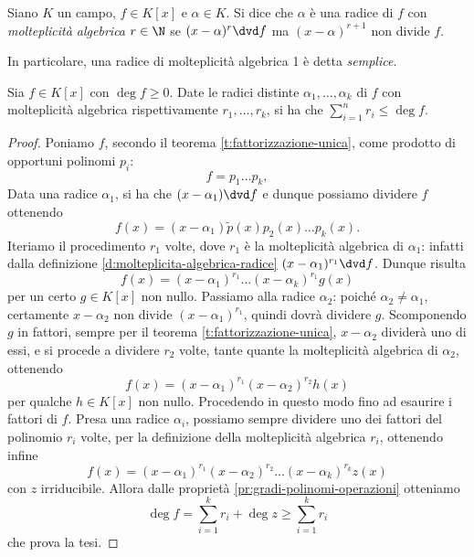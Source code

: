 \begin{definizione} \label{d:molteplicita-algebrica-radice}
	Siano $K$ un campo, $f\in K[x]$ e $\alpha\in K$.
	Si dice che $\alpha$ è una radice di $f$ con \emph{molteplicità algebrica} $r\in \N$ se $(x-\alpha)^r\dvd f$ ma $(x-\alpha)^{r+1}$ non divide $f$.
\end{definizione}
In particolare, una radice di molteplicità algebrica 1 è detta \emph{semplice}.
\begin{teorema}\label{dimensione-molteplicita-algebrica}
	Sia $f\in K[x]$ con $\deg f\ge 0$.
	Date le radici distinte $\alpha_1,\dots,\alpha_k$ di $f$ con molteplicità algebrica rispettivamente $r_1,\dots,r_k$, si ha che $\sum_{i=1}^n r_i\le\deg f$.
\end{teorema}
\begin{proof}
	Poniamo $f$, secondo il teorema \ref{t:fattorizzazione-unica}, come prodotto di opportuni polinomi $p_i$:
	\begin{equation}
		f = p_1\dots p_k,
	\end{equation}
	Data una radice $\alpha_1$, si ha che $(x-\alpha_1)\dvd f$ e dunque possiamo dividere $f$ ottenendo
	\begin{equation}
		f(x) = (x-\alpha_1)\tilde{p}(x)p_2(x)\dots p_k(x).
	\end{equation}
	Iteriamo il procedimento $r_1$ volte, dove $r_1$ è la molteplicità algebrica di $\alpha_1$: infatti dalla definizione \ref{d:molteplicita-algebrica-radice} $(x-\alpha_1)^{r_1}\dvd f$.
	Dunque risulta
	\begin{equation}
		f(x) = (x-\alpha_1)^{r_1}\dots(x-\alpha_k)^{r_1}g(x)
	\end{equation}
	per un certo $g\in K[x]$ non nullo.
	Passiamo alla radice $\alpha_2$: poich\'e $\alpha_2\ne\alpha_1$, certamente $x-\alpha_2$ non divide $(x-\alpha_1)^{r_1}$, quindi dovrà dividere $g$.
	Scomponendo $g$ in fattori, sempre per il teorema \ref{t:fattorizzazione-unica}, $x-\alpha_2$ dividerà uno di essi, e si procede a dividere $r_2$ volte, tante quante la molteplicità algebrica di $\alpha_2$, ottenendo
	\begin{equation}
		f(x)=(x-\alpha_1)^{r_1}(x-\alpha_2)^{r_2}h(x)
	\end{equation}
	per qualche $h\in K[x]$ non nullo.
	Procedendo in questo modo fino ad esaurire i fattori di $f$.
	Presa una radice $\alpha_i$, possiamo sempre dividere uno dei fattori del polinomio $r_i$ volte, per la definizione della molteplicità algebrica $r_i$, ottenendo infine
	\begin{equation}
		f(x)=(x-\alpha_1)^{r_1}(x-\alpha_2)^{r_2}\dots(x-\alpha_k)^{r_k}z(x)
	\end{equation}
	con $z$ irriducibile.
	Allora dalle proprietà \ref{pr:gradi-polinomi-operazioni} otteniamo
	\begin{equation}
		\deg f=\sum_{i=1}^kr_i+\deg z\ge\sum_{i=1}^kr_i
	\end{equation}
	che prova la tesi.
\end{proof}

